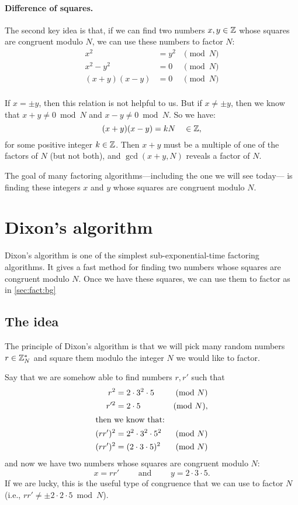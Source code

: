 \paragraph{Difference of squares.}
The second key idea is that, if we can find two numbers $x,y \in \mathbb{Z}$ whose
squares are congruent modulo $N$, we can use these numbers to factor $N$:
\begin{align*}
x^2 &= y^2 &\pmod N \\
x^2 - y^2 &= 0 &\pmod N\\
(x+y)(x-y) &= 0 &\pmod N\\
\end{align*}

If $x = \pm y$, then this relation is not helpful to us.
But if $x \neq \pm y$, then we know that
$x+y \neq 0 \bmod N$ and $x-y \neq 0 \bmod N$.
So we have:
\[ (x+y)(x-y) = kN \quad \in \mathbb{Z},\]
for some positive integer $k \in \mathbb{Z}$.
Then $x+y$ must be a multiple of one of the factors of $N$ (but not both),
and $\gcd(x+y, N)$ reveals a factor of $N$. 

The goal of many factoring algorithms---including the one we will see today---%
is finding these integers $x$ and $y$ whose squares are congruent modulo $N$.

\section{Dixon's algorithm}

Dixon's algorithm is one of the simplest sub-exponential-time factoring algorithms.
It gives a fast method for finding two numbers whose squares are congruent modulo $N$.
Once we have these squares, we can use them to factor as in \cref{sec:fact:bg}

\subsection{The idea}

The principle of Dixon's algorithm is that we will pick 
many random numbers $r \in \mathbb{Z}^*_N$ and square them modulo 
the integer $N$ we would like to factor.

Say that we are somehow able to find numbers $r, r'$ such that
\begin{align*}
  r^2 &= 2 \cdot 3^2 \cdot 5 &\pmod N\\
  r'^2 &= 2 \cdot 5 &\pmod N,\\
\intertext{then we know that:}
(rr')^2 &= 2^2 \cdot 3^2 \cdot 5^2 &\pmod N\\
(rr')^2 &= (2 \cdot 3 \cdot 5)^2 &\pmod N
\end{align*}
and now we have two numbers whose squares
are congruent modulo $N$:
\[ x = r r' \qquad \text{ and }\qquad y = 2 \cdot 3 \cdot 5.\]
If we are lucky, this is the useful type of congruence that
we can use to factor $N$ (i.e., $r r' \neq \pm 2 \cdot 2 \cdot 5 \bmod N$).

